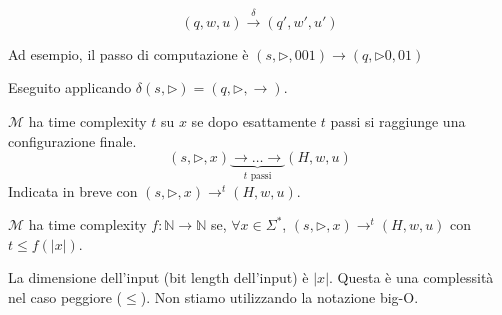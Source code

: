 \begin{definition}
    $$
        (q,w,u) \overset{\delta}{\to} (q',w',u') 
    $$
\end{definition}
Ad esempio, il passo di computazione è $(s,\rhd,001)\to(q,\rhd 0,01)$
\begin{center}
\end{center}
Eseguito applicando $\delta(s,\rhd)=(q,\rhd,\to)$.


\begin{definition}
    $\mathcal{M}$ ha time complexity $t$ su $x$ se dopo esattamente $t$ passi si raggiunge una configurazione finale.
    $$
        (s,\rhd,x)\underbrace{\to\dots\to}_{t\text{ passi}}(H,w,u)
    $$
    Indicata in breve con $(s,\rhd,x)\to^t(H,w,u)$.\medskip

    \noindent $\mathcal{M}$ ha time complexity $f:\mathbb{N}\to\mathbb{N}$ se, $\forall x\in\Sigma^*$, $(s,\rhd,x)\to^t(H,w,u)$ con $t\leq f(|x|)$.
\end{definition}
La dimensione dell'input (bit length dell'input) è $|x|$. Questa è una complessità nel caso peggiore ($\leq$). Non stiamo utilizzando la notazione big-O.



